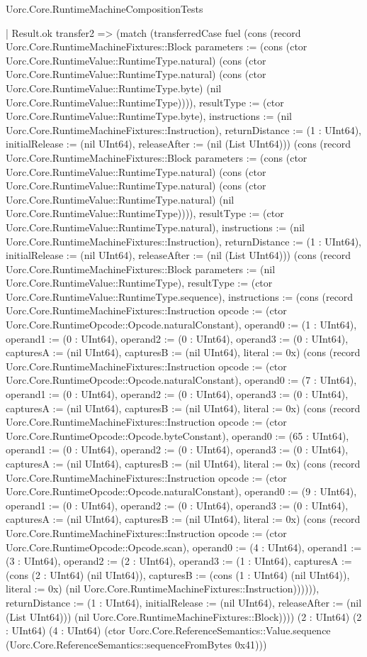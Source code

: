 \begin{lexlean}{Uorc.Core.RuntimeMachineCompositionTests}
\begin{semanticmodule}
{        | Result.ok transfer2 => (match (transferredCase fuel (cons (record Uorc.Core.RuntimeMachineFixtures::Block {parameters := (cons (ctor Uorc.Core.RuntimeValue::RuntimeType.natural) (cons (ctor Uorc.Core.RuntimeValue::RuntimeType.natural) (cons (ctor Uorc.Core.RuntimeValue::RuntimeType.byte) (nil Uorc.Core.RuntimeValue::RuntimeType)))), resultType := (ctor Uorc.Core.RuntimeValue::RuntimeType.byte), instructions := (nil Uorc.Core.RuntimeMachineFixtures::Instruction), returnDistance := (1 : UInt64), initialRelease := (nil UInt64), releaseAfter := (nil (List UInt64))}) (cons (record Uorc.Core.RuntimeMachineFixtures::Block {parameters := (cons (ctor Uorc.Core.RuntimeValue::RuntimeType.natural) (cons (ctor Uorc.Core.RuntimeValue::RuntimeType.natural) (cons (ctor Uorc.Core.RuntimeValue::RuntimeType.natural) (nil Uorc.Core.RuntimeValue::RuntimeType)))), resultType := (ctor Uorc.Core.RuntimeValue::RuntimeType.natural), instructions := (nil Uorc.Core.RuntimeMachineFixtures::Instruction), returnDistance := (1 : UInt64), initialRelease := (nil UInt64), releaseAfter := (nil (List UInt64))}) (cons (record Uorc.Core.RuntimeMachineFixtures::Block {parameters := (nil Uorc.Core.RuntimeValue::RuntimeType), resultType := (ctor Uorc.Core.RuntimeValue::RuntimeType.sequence), instructions := (cons (record Uorc.Core.RuntimeMachineFixtures::Instruction {opcode := (ctor Uorc.Core.RuntimeOpcode::Opcode.naturalConstant), operand0 := (1 : UInt64), operand1 := (0 : UInt64), operand2 := (0 : UInt64), operand3 := (0 : UInt64), capturesA := (nil UInt64), capturesB := (nil UInt64), literal := 0x}) (cons (record Uorc.Core.RuntimeMachineFixtures::Instruction {opcode := (ctor Uorc.Core.RuntimeOpcode::Opcode.naturalConstant), operand0 := (7 : UInt64), operand1 := (0 : UInt64), operand2 := (0 : UInt64), operand3 := (0 : UInt64), capturesA := (nil UInt64), capturesB := (nil UInt64), literal := 0x}) (cons (record Uorc.Core.RuntimeMachineFixtures::Instruction {opcode := (ctor Uorc.Core.RuntimeOpcode::Opcode.byteConstant), operand0 := (65 : UInt64), operand1 := (0 : UInt64), operand2 := (0 : UInt64), operand3 := (0 : UInt64), capturesA := (nil UInt64), capturesB := (nil UInt64), literal := 0x}) (cons (record Uorc.Core.RuntimeMachineFixtures::Instruction {opcode := (ctor Uorc.Core.RuntimeOpcode::Opcode.naturalConstant), operand0 := (9 : UInt64), operand1 := (0 : UInt64), operand2 := (0 : UInt64), operand3 := (0 : UInt64), capturesA := (nil UInt64), capturesB := (nil UInt64), literal := 0x}) (cons (record Uorc.Core.RuntimeMachineFixtures::Instruction {opcode := (ctor Uorc.Core.RuntimeOpcode::Opcode.scan), operand0 := (4 : UInt64), operand1 := (3 : UInt64), operand2 := (2 : UInt64), operand3 := (1 : UInt64), capturesA := (cons (2 : UInt64) (nil UInt64)), capturesB := (cons (1 : UInt64) (nil UInt64)), literal := 0x}) (nil Uorc.Core.RuntimeMachineFixtures::Instruction)))))), returnDistance := (1 : UInt64), initialRelease := (nil UInt64), releaseAfter := (nil (List UInt64))}) (nil Uorc.Core.RuntimeMachineFixtures::Block)))) (2 : UInt64) (2 : UInt64) (4 : UInt64) (ctor Uorc.Core.ReferenceSemantics::Value.sequence (Uorc.Core.ReferenceSemantics::sequenceFromBytes 0x41)))
}
\end{semanticmodule}
\end{lexlean}

